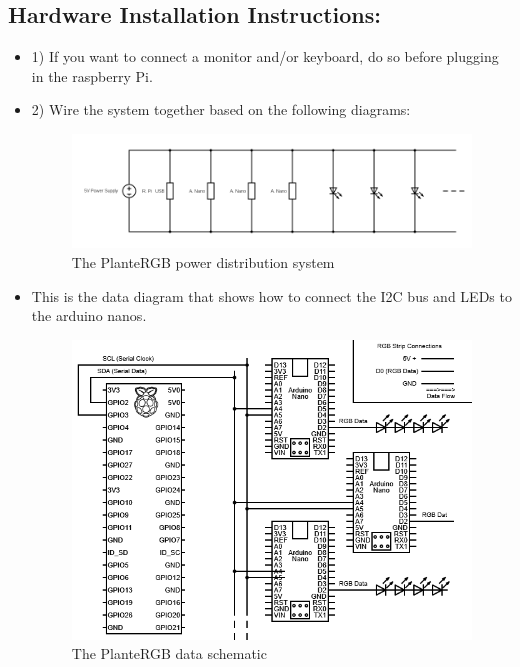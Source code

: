 \documentclass[onecolumn, draftclsnofoot,10pt, compsoc]{IEEEtran}
\begin{document}
	\subsection{\textbf{Hardware Installation Instructions:}}
	\begin{itemize}
		\item 1) If you want to connect a monitor and/or keyboard, do so before plugging in the raspberry Pi.
		\item 2) Wire the system together based on the following diagrams:

		\begin{center}
			\begin{figure}[H]
				\includegraphics[width=\linewidth]{systemDiagrams/power-distribution-schematic.png}
				\caption{The PlanteRGB power distribution system}
				\label{fig:systemDiagram}
			\end{figure}
		\end{center}

		\item This is the data diagram that shows how to connect the I2C bus and LEDs to the arduino nanos.
		
		\begin{center}
			\begin{figure}[H]
				\includegraphics[width=\linewidth]{systemDiagrams/I2C-bus.png}
				\caption{The PlanteRGB data schematic}
				\label{fig:systemDiagram}
			\end{figure}
		\end{center}


\end{itemize}
\end{document}
